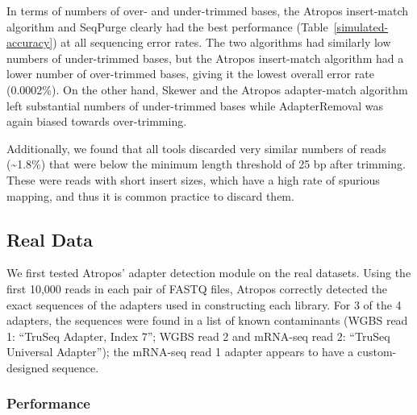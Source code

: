 \documentclass[fleqn,10pt,lineno]{wlpeerj} %
\begin{document}
In terms of numbers of over- and under-trimmed bases, the Atropos insert-match algorithm and SeqPurge clearly had the best performance (Table~\ref{simulated-accuracy}) at all sequencing error rates. The two algorithms had similarly low numbers of under-trimmed bases, but the Atropos insert-match algorithm had a lower number of over-trimmed bases, giving it the lowest overall error rate (0.0002\%). On the other hand, Skewer and the Atropos adapter-match algorithm left substantial numbers of under-trimmed bases while AdapterRemoval was again biased towards over-trimming. 

Additionally, we found that all tools discarded very similar numbers of reads (\textasciitilde{}1.8\%) that were below the minimum length threshold of 25 bp after trimming. These were reads with short insert sizes, which have a high rate of spurious mapping, and thus it is common practice to discard them. 

\subsection{Real Data}

We first tested Atropos' adapter detection module on the real datasets. Using the first 10,000 reads in each pair of FASTQ files, Atropos correctly detected the exact sequences of the adapters used in constructing each library. For 3 of the 4 adapters, the sequences were found in a list of known contaminants (WGBS read 1: ``TruSeq Adapter, Index 7''; WGBS read 2 and mRNA-seq read 2: ``TruSeq Universal Adapter''); the mRNA-seq read 1 adapter appears to have a custom-designed sequence.

\subsubsection{Performance}
\end{document}
